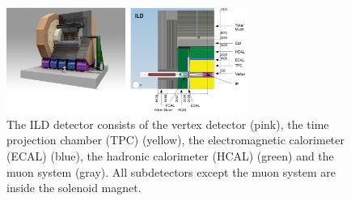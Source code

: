 \begin{figure}
\centering
\includegraphics[width=0.7\textwidth]{Figures/ILD.png}
\caption[Schematic drawing of the ILD detector]{The ILD detector consists of the vertex detector (pink), the time projection chamber (TPC) (yellow), the electromagnetic calorimeter (ECAL) (blue), the hadronic calorimeter (HCAL) (green) and the muon system (gray). All subdetectors except the muon system are inside the solenoid magnet.\cite[p. 34]{TDR1}}
\label{fig:ILD}
\end{figure}

